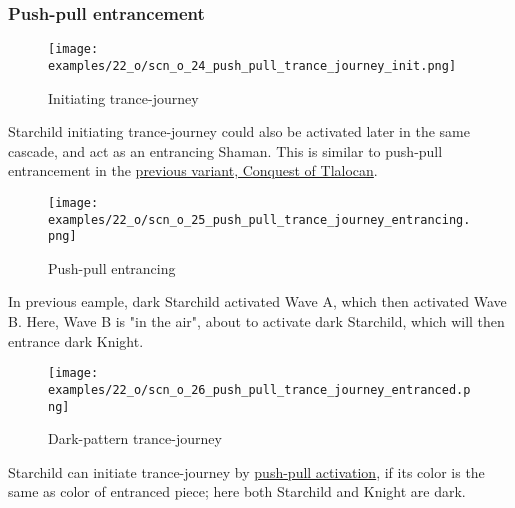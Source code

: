 \clearpage %

\subsubsection*{Push-pull entrancement}

\vspace*{-0.9\baselineskip}
\noindent
\begin{wrapfigure}[7]{l}{0.4\textwidth} %
\centering
\texttt{[image: examples/22\_o/scn\_o\_24\_push\_pull\_trance\_journey\_init.png]}
\caption{Initiating trance-journey}
\label{fig:scn_o_24_push_pull_trance_journey_init}
\end{wrapfigure}
Starchild initiating trance-journey could also be activated later in the same cascade,
and act as an entrancing Shaman. This is similar to push-pull entrancement in the
\hyperref[fig:star/scn_cot_33_push_pull_entrancement_start]{previous variant, Conquest of Tlalocan}.

\vspace*{3.9\baselineskip} %
\noindent
\begin{wrapfigure}[10]{l}{0.4\textwidth} %
\centering
\texttt{[image: examples/22\_o/scn\_o\_25\_push\_pull\_trance\_journey\_entrancing.png]}
\caption{Push-pull entrancing}
\label{fig:scn_o_25_push_pull_trance_journey_entrancing}
\end{wrapfigure}
In previous eample, dark Starchild activated Wave A, which then activated Wave B.
Here, Wave B is "in the air", about to activate dark Starchild, which will then
entrance dark Knight.

\clearpage %

\noindent
\begin{figure}[!h]
\texttt{[image: examples/22\_o/scn\_o\_26\_push\_pull\_trance\_journey\_entranced.png]}
\caption{Dark-pattern trance-journey}
\label{fig:scn_o_26_push_pull_trance_journey_entranced}
\end{figure}

Starchild can initiate trance-journey by
\hyperref[sec:Terms/Push-pull activation]{push-pull activation},
if its color is the same as color of entranced piece; here both Starchild and Knight
are dark.

